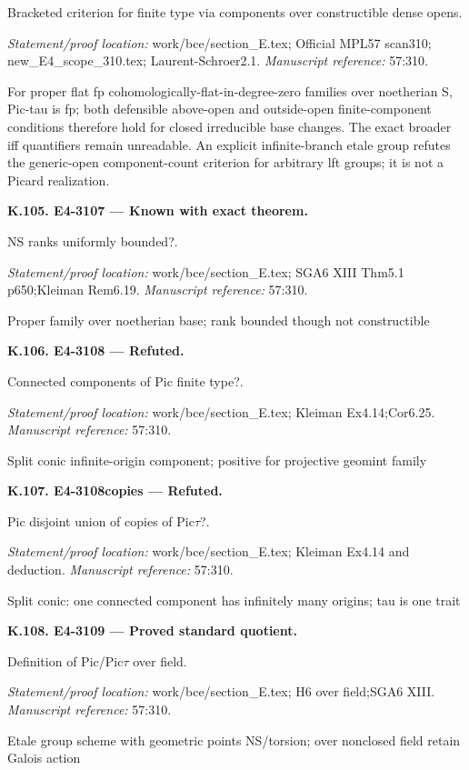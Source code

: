 Bracketed criterion for finite type via components over constructible dense opens.
\par\emph{Statement/proof location:} work/bce/section\_E.tex; Official MPL57 scan310; new\_E4\_scope\_310.tex; Laurent-Schroer2.1.
\emph{Manuscript reference:} 57:310.
\par For proper flat fp cohomologically-flat-in-degree-zero families over noetherian S, Pic-tau is fp; both defensible above-open and outside-open finite-component conditions therefore hold for closed irreducible base changes. The exact broader iff quantifiers remain unreadable. An explicit infinite-branch etale group refutes the generic-open component-count criterion for arbitrary lft groups; it is not a Picard realization.
\par\medskip\noindent\textbf{K.105. E4-3107 --- Known with exact theorem.}\par
NS ranks uniformly bounded?.
\par\emph{Statement/proof location:} work/bce/section\_E.tex; SGA6 XIII Thm5.1 p650;Kleiman Rem6.19.
\emph{Manuscript reference:} 57:310.
\par Proper family over noetherian base; rank bounded though not constructible
\par\medskip\noindent\textbf{K.106. E4-3108 --- Refuted.}\par
Connected components of Pic finite type?.
\par\emph{Statement/proof location:} work/bce/section\_E.tex; Kleiman Ex4.14;Cor6.25.
\emph{Manuscript reference:} 57:310.
\par Split conic infinite-origin component; positive for projective geomint family
\par\medskip\noindent\textbf{K.107. E4-3108copies --- Refuted.}\par
Pic disjoint union of copies of Pic\ensuremath{\tau}?.
\par\emph{Statement/proof location:} work/bce/section\_E.tex; Kleiman Ex4.14 and deduction.
\emph{Manuscript reference:} 57:310.
\par Split conic: one connected component has infinitely many origins; tau is one trait
\par\medskip\noindent\textbf{K.108. E4-3109 --- Proved standard quotient.}\par
Definition of Pic/Pic\ensuremath{\tau} over field.
\par\emph{Statement/proof location:} work/bce/section\_E.tex; H6 over field;SGA6 XIII.
\emph{Manuscript reference:} 57:310.
\par Etale group scheme with geometric points NS/torsion; over nonclosed field retain Galois action
